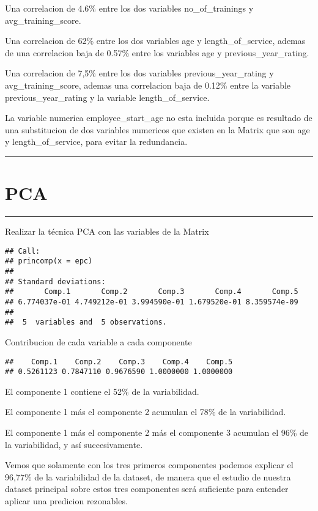 \documentclass[
]{article}
\begin{document}
Una correlacion de 4.6\% entre los dos variables no\_of\_trainings y
avg\_training\_score.

Una correlacion de 62\% entre los dos variables age y
length\_of\_service, ademas de una correlacion baja de 0.57\% entre los
variables age y previous\_year\_rating.

Una correlacion de 7,5\% entre los dos variables previous\_year\_rating
y avg\_training\_score, ademas una correlacion baja de 0.12\% entre la
variable previous\_year\_rating y la variable length\_of\_service.

La variable numerica employee\_start\_age no esta incluida porque es
resultado de una substitucion de dos variables numericos que existen en
la Matrix que son age y length\_of\_service, para evitar la redundancia.

\begin{center}\rule{0.5\linewidth}{0.5pt}\end{center}

\hypertarget{pca}{%
\section{PCA}\label{pca}}

\begin{center}\rule{0.5\linewidth}{0.5pt}\end{center}

Realizar la técnica PCA con las variables de la Matrix

\begin{verbatim}
## Call:
## princomp(x = epc)
## 
## Standard deviations:
##       Comp.1       Comp.2       Comp.3       Comp.4       Comp.5 
## 6.774037e-01 4.749212e-01 3.994590e-01 1.679520e-01 8.359574e-09 
## 
##  5  variables and  5 observations.
\end{verbatim}

Contribucion de cada variable a cada componente

\begin{verbatim}
##    Comp.1    Comp.2    Comp.3    Comp.4    Comp.5 
## 0.5261123 0.7847110 0.9676590 1.0000000 1.0000000
\end{verbatim}

El componente 1 contiene el 52\% de la variabilidad.

El componente 1 más el componente 2 acumulan el 78\% de la variabilidad.

El componente 1 más el componente 2 más el componente 3 acumulan el 96\%
de la variabilidad, y así succesivamente.

Vemos que solamente con los tres primeros componentes podemos explicar
el 96,77\% de la variabilidad de la dataset, de manera que el estudio de
nuestra dataset principal sobre estos tres componentes será suficiente
para entender aplicar una predicion rezonables.\\
\end{document}
